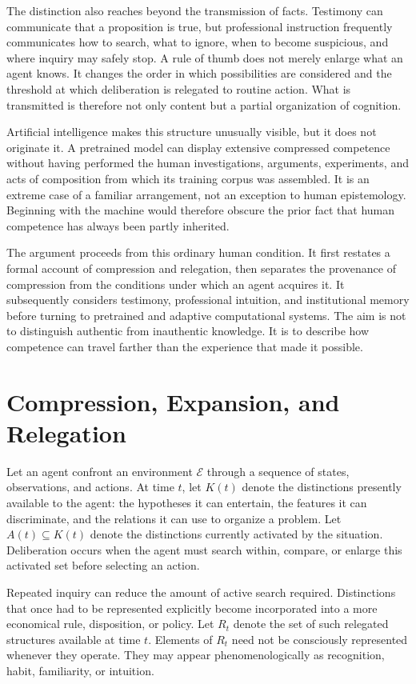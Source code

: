 \documentclass[11pt]{article}
\begin{document}
The distinction also reaches beyond the transmission of facts. Testimony can communicate that a proposition is true, but professional instruction frequently communicates how to search, what to ignore, when to become suspicious, and where inquiry may safely stop. A rule of thumb does not merely enlarge what an agent knows. It changes the order in which possibilities are considered and the threshold at which deliberation is relegated to routine action. What is transmitted is therefore not only content but a partial organization of cognition.

Artificial intelligence makes this structure unusually visible, but it does not originate it. A pretrained model can display extensive compressed competence without having performed the human investigations, arguments, experiments, and acts of composition from which its training corpus was assembled. It is an extreme case of a familiar arrangement, not an exception to human epistemology. Beginning with the machine would therefore obscure the prior fact that human competence has always been partly inherited.

The argument proceeds from this ordinary human condition. It first restates a formal account of compression and relegation, then separates the provenance of compression from the conditions under which an agent acquires it. It subsequently considers testimony, professional intuition, and institutional memory before turning to pretrained and adaptive computational systems. The aim is not to distinguish authentic from inauthentic knowledge. It is to describe how competence can travel farther than the experience that made it possible.

\section{Compression, Expansion, and Relegation}

Let an agent confront an environment $\mathcal{E}$ through a sequence of states, observations, and actions. At time $t$, let $K(t)$ denote the distinctions presently available to the agent: the hypotheses it can entertain, the features it can discriminate, and the relations it can use to organize a problem. Let $A(t) \subseteq K(t)$ denote the distinctions currently activated by the situation. Deliberation occurs when the agent must search within, compare, or enlarge this activated set before selecting an action.

Repeated inquiry can reduce the amount of active search required. Distinctions that once had to be represented explicitly become incorporated into a more economical rule, disposition, or policy. Let $R_t$ denote the set of such relegated structures available at time $t$. Elements of $R_t$ need not be consciously represented whenever they operate. They may appear phenomenologically as recognition, habit, familiarity, or intuition.
\end{document}
